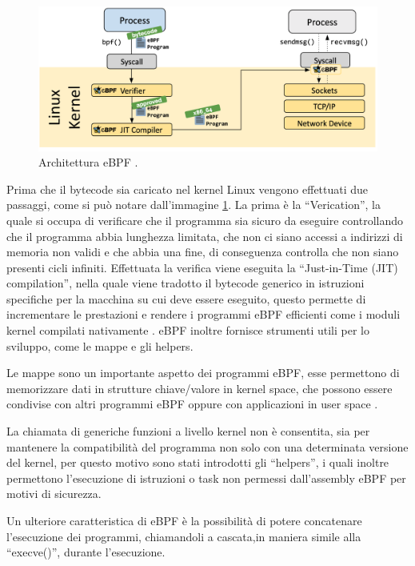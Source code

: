 \begin{figure}[]
    \label{fig:ebpf}
    \includegraphics[width=\hsize]{images/mitigazione/ebpf_architecture.png}
    \caption{Architettura eBPF \cite{ebpf.io}.}
    \centering
\end{figure}

Prima che il bytecode sia caricato nel kernel Linux vengono effettuati due passaggi, come si può notare dall'immagine \ref{fig:ebpf}. La prima è la ``Verication'', la quale si occupa di verificare che il programma sia sicuro da eseguire controllando che il programma abbia lunghezza limitata, che non ci siano accessi a indirizzi di memoria non validi e che abbia una fine, di conseguenza controlla che non siano presenti cicli infiniti. 
Effettuata la verifica viene eseguita la ``Just-in-Time (JIT) compilation'', nella quale viene tradotto il bytecode generico in istruzioni specifiche per la macchina su cui deve essere eseguito, questo permette di incrementare le prestazioni e rendere i programmi eBPF efficienti come i moduli kernel compilati nativamente \cite{ebpf.io}.
eBPF inoltre fornisce strumenti utili per lo sviluppo, come le mappe e gli helpers.

Le mappe sono un importante aspetto dei programmi eBPF, esse permettono di memorizzare dati in strutture chiave/valore in kernel space, che possono essere condivise con altri programmi eBPF oppure con applicazioni in user space \cite{cilium_ebpf}.

La chiamata di generiche funzioni a livello kernel non è consentita, sia per mantenere la compatibilità del programma non solo con una determinata versione del kernel, per questo motivo sono stati introdotti gli ``helpers'', i quali inoltre permettono l'esecuzione di istruzioni o task non permessi dall'assembly eBPF per motivi di sicurezza.

Un ulteriore caratteristica di eBPF è la possibilità di potere concatenare l'esecuzione dei programmi, chiamandoli a cascata,in maniera simile alla ``execve()'', durante l'esecuzione.

